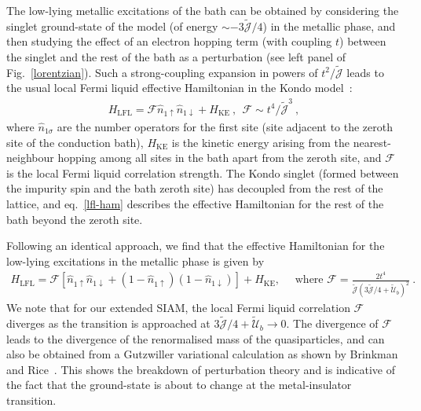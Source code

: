 \documentclass{iopart}
\begin{document}
The low-lying metallic excitations of the bath can be obtained by considering the singlet ground-state of the model (of energy \(\sim -3\mathcal{\tilde J}/4\)) in the metallic phase, and then studying the effect of an electron hopping term (with coupling \(t\)) between the singlet and the rest of the bath as a perturbation (see left panel of Fig.~\eqref{lorentzian}). Such a strong-coupling expansion in powers of \(t^2/\mathcal{\tilde J}\) leads to the usual local Fermi liquid effective Hamiltonian in the Kondo model~\cite{nozieres1974fermi,wilson1975,Noz_blandin_1980,anirban_kondo}:
\begin{eqnarray}
	\label{lfl-ham}
	H_\text{LFL} = \mathcal{F} \hat n_{1 \uparrow} \hat n_{1 \downarrow} + H_\text{KE}~, ~ ~ \mathcal{F} \sim t^4 / \mathcal{\tilde J}^3~,
\end{eqnarray}
where \(\hat n_{1 \sigma}\) are the number operators for the first site (site adjacent to the zeroth site of the conduction bath), \(H_\text{KE}\) is the kinetic energy arising from the nearest-neighbour hopping among all sites in the bath apart from the zeroth site, and \(\mathcal{F}\) is the local Fermi liquid correlation strength. The Kondo singlet (formed between the impurity spin and the bath zeroth site) has decoupled from the rest of the lattice, and eq.~\eqref{lfl-ham} describes the effective Hamiltonian for the rest of the bath beyond the zeroth site. 

Following an identical approach, we find that the effective Hamiltonian for the low-lying excitations in the metallic phase is given by
\begin{eqnarray}
	H_\text{LFL} = \mathcal{F}\left[\hat n_{1 \uparrow} \hat n_{1 \downarrow} + \left(1 - \hat n_{1 \uparrow}\right) \left(1 - \hat n_{1 \downarrow}\right) \right] + H_\text{KE},\quad \text{ where }\mathcal{F} = \frac{2t^4}{\mathcal{\tilde J}\left(3\mathcal{\tilde J}/4 + \mathcal{\tilde U}_b\right)^2}~.
\end{eqnarray}
We note that for our extended SIAM, the local Fermi liquid correlation \(\mathcal{F}\) diverges as the transition is approached at \(3\mathcal{\tilde J}/4 + \mathcal{\tilde U}_b \to 0\). The divergence of \(\mathcal{F}\) leads to the divergence of the renormalised mass of the quasiparticles, and can also be obtained from a Gutzwiller variational calculation as shown by Brinkman and Rice~\cite{brinkman_rice_1970}. This shows the breakdown of perturbation theory and is indicative of the fact that the ground-state is about to change at the metal-insulator transition.
\end{document}
